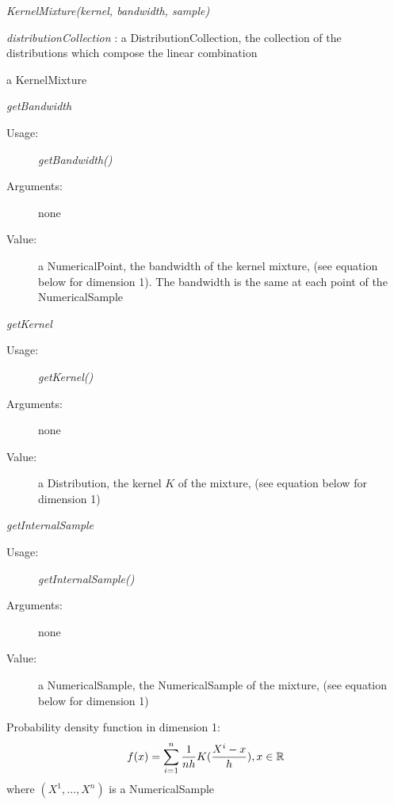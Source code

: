 \begin{description}

\item[Usage:] \textit{KernelMixture(kernel, bandwidth, sample)}

\item[Arguments:] \textit{distributionCollection}    : a DistributionCollection, the collection of the  distributions which compose the linear combination


\item[Value:] a  KernelMixture

\item[Some methods:]  \rule{0pt}{1em}
\begin{description}
\item \textit{getBandwidth}
\begin{description}
\item[Usage:] \textit{getBandwidth()}
\item[Arguments:] none
\item[Value:] a NumericalPoint, the bandwidth of the kernel mixture, (see equation below for dimension 1). The bandwidth is the same at each point of the NumericalSample
\end{description}
\bigskip

\item \textit{getKernel}
\begin{description}
\item[Usage:] \textit{getKernel()}
\item[Arguments:] none
\item[Value:] a Distribution, the kernel $K$ of the mixture, (see equation below for dimension 1)
\end{description}
\bigskip

\item \textit{getInternalSample}
\begin{description}
\item[Usage:] \textit{getInternalSample()}
\item[Arguments:] none
\item[Value:] a NumericalSample, the NumericalSample of the mixture, (see equation below for dimension 1)
\end{description}


\end{description}

\item[Details:]  \rule{0pt}{1em}
\begin{description}
\item Probability density function in dimension 1:
\begin{equation}
f(x) =  \sum_{i=1}^n \frac{1}{nh}K(\frac{X^i-x}{h}), x \in {\mathbb R}
\end{equation}
where $(X^1, \dots, X^n)$ is  a NumericalSample
\end{description}

\item[Links:]  \rule{0pt}{1em}
\end{description}

